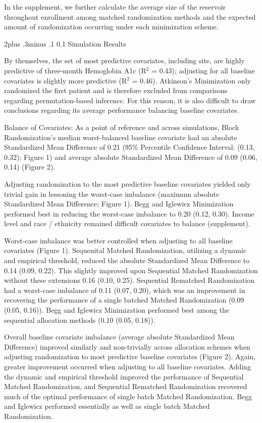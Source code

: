 \documentclass[12pt,oneside]{book}
\makeatletter
\newlength{\li}\setlength{\li}{14.48pt}
\newlength{\di}\setlength{\di}{-3.5mm}
\renewcommand\subsection{\@startsection {subsection}{2}{\z@}%
    {2\@bls  plus .3\@bls minus .1\@bls}%
    {0.1\@bls}%
    {\noindent\normalfont}}
\theoremstyle{definition}
\theoremstyle{definition}
\theoremstyle{definition}
\theoremstyle{remark}
\makeatother
\begin{document}
In the supplement, we further calculate the average size of the
reservoir throughout enrollment among matched randomization methods and
the expected amount of randomization occurring under each minimization
scheme.

\hypertarget{simulation-results}{%
\subsection{Simulation Results}\label{simulation-results}}

By themselves, the set of most predictive covariates, including site,
are highly predictive of three-month Hemoglobin A1c (R\(^2\) = 0.43);
adjusting for all baseline covariates is slightly more predictive
(R\(^2\) = 0.46). Atkinson's Minimization only randomized the first
patient and is therefore excluded from comparisons regarding
permutation-based inference. For this reason, it is also difficult to
draw conclusions regarding its average performance balancing baseline
covariates.

Balance of Covariates: As a point of reference and across simulations,
Block Randomization's median worst-balanced baseline covariate had an
absolute Standardized Mean Difference of 0.21 (95\% Percentile
Confidence Interval: (0.13, 0.32); Figure 1) and average absolute
Standardized Mean Difference of 0.09 (0.06, 0.14) (Figure 2).

Adjusting randomization to the most predictive baseline covariates
yielded only trivial gain in lessoning the worst-case imbalance (maximum
absolute Standardized Mean Difference; Figure 1). Begg and Iglewicz
Minimization performed best in reducing the worst-case imbalance to 0.20
(0.12, 0.30). Income level and race / ethnicity remained difficult
covariates to balance (supplement).

Worst-case imbalance was better controlled when adjusting to all
baseline covariates (Figure 1). Sequenital Matched Randomization,
utilizing a dynamic and empirical threshold, reduced the absolute
Standardized Mean Difference to 0.14 (0.09, 0.22). This slightly
improved upon Sequential Matched Randomization without these extensions
0.16 (0.10, 0.25). Sequential Rematched Randomization had a worst-case
imbalance of 0.11 (0.07, 0.20), which was an improvement in recovering
the performance of a single batched Matched Randomization (0.09 (0.05,
0.16)). Begg and Iglewicz Minimization performed best among the
sequential allocation methods (0.10 (0.05, 0.18)).

Overall baseline covariate imbalance (average absolute Standardized Mean
Difference) improved similarly and non-trivially across allocation
schemes when adjusting randomization to most predictive baseline
covariates (Figure 2). Again, greater improvement occurred when
adjusting to all baseline covariates. Adding the dynamic and empirical
threshold improved the performance of Sequential Matched Randomization,
and Sequential Rematched Randomization recovered much of the optimal
performance of single batch Matched Randomization. Begg and Iglewicz
performed essentially as well as single batch Matched Randomization.
\end{document}
